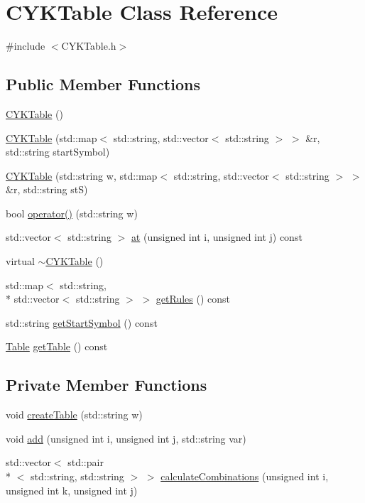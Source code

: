 \hypertarget{classCYKTable}{\section{C\-Y\-K\-Table Class Reference}
\label{classCYKTable}
}


{\ttfamily \#include $<$C\-Y\-K\-Table.\-h$>$}

\subsection*{Public Member Functions}
\begin{DoxyCompactItemize}
\item 
\hyperlink{classCYKTable_ac96905a2f347c63cfda59d55fc97d90a}{C\-Y\-K\-Table} ()
\item 
\hyperlink{classCYKTable_a9bcbd180cfda8d5c47587f67026d89ad}{C\-Y\-K\-Table} (std\-::map$<$ std\-::string, std\-::vector$<$ std\-::string $>$ $>$ \&r, std\-::string start\-Symbol)
\item 
\hyperlink{classCYKTable_abd9ea746b2c4ed848819efbf95645cc4}{C\-Y\-K\-Table} (std\-::string w, std\-::map$<$ std\-::string, std\-::vector$<$ std\-::string $>$ $>$ \&r, std\-::string st\-S)
\item 
bool \hyperlink{classCYKTable_ac756a60dc99c8557ad5d11e557b30f57}{operator()} (std\-::string w)
\item 
std\-::vector$<$ std\-::string $>$ \hyperlink{classCYKTable_a9d53e2b07637d13ed72b97b007a09cf4}{at} (unsigned int i, unsigned int j) const 
\item 
virtual \hyperlink{classCYKTable_af136b6ce499fe3375cf58a9897f2a855}{$\sim$\-C\-Y\-K\-Table} ()
\item 
std\-::map$<$ std\-::string, \\*
std\-::vector$<$ std\-::string $>$ $>$ \hyperlink{classCYKTable_a4f57052001961a166453e5cd224d52e8}{get\-Rules} () const 
\item 
std\-::string \hyperlink{classCYKTable_af2065276b21835ad5ddbdb2d5ac9f90d}{get\-Start\-Symbol} () const 
\item 
\hyperlink{CYKTable_8h_a98fc1757708d007972f5f4640a85323e}{Table} \hyperlink{classCYKTable_a8de3508f979280f9b4c4a7b08f68f05a}{get\-Table} () const 
\end{DoxyCompactItemize}
\subsection*{Private Member Functions}
\begin{DoxyCompactItemize}
\item 
void \hyperlink{classCYKTable_a7aaee4d68e79f91fb6ff28b14f63668a}{create\-Table} (std\-::string w)
\item 
void \hyperlink{classCYKTable_a0cef9ae424db0d878c6d22808c1ce37a}{add} (unsigned int i, unsigned int j, std\-::string var)
\item 
std\-::vector$<$ std\-::pair\\*
$<$ std\-::string, std\-::string $>$ $>$ \hyperlink{classCYKTable_a570a60f85560234161476aa53d526931}{calculate\-Combinations} (unsigned int i, unsigned int k, unsigned int j)
\end{DoxyCompactItemize}
